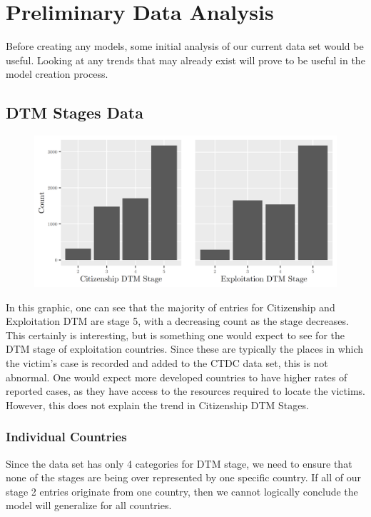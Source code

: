\documentclass{article} %
\begin{document}
\newpage
\section{Preliminary Data Analysis}

Before creating any models, some initial analysis of our current data set would be useful. Looking at any trends that may already exist will prove to be useful in the model creation process.

\subsection{DTM Stages Data}

\FloatBarrier
\begin{figure}[H]
	\includegraphics[width=\textwidth]{DTMStagesBarplot}
\end{figure}
\FloatBarrier

In this graphic, one can see that the majority of entries for Citizenship and Exploitation DTM are stage 5, with a decreasing count as the stage decreases. This certainly is interesting, but is something one would expect to see for the DTM stage of exploitation countries. Since these are typically the places in which the victim's case is recorded and added to the CTDC data set, this is not abnormal. One would expect more developed countries to have higher rates of reported cases, as they have access to the resources required to locate the victims. However, this does not explain the trend in Citizenship DTM Stages.

\subsubsection*{Individual Countries}

Since the data set has only 4 categories for DTM stage, we need to ensure that none of the stages are being over represented by one specific country. If all of our stage 2 entries originate from one country, then we cannot logically conclude the model will generalize for all countries.
\end{document}
